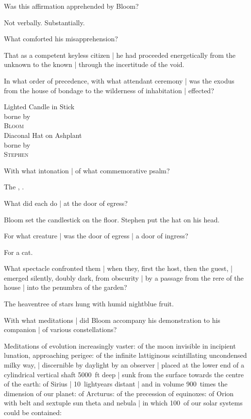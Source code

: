 Was this affirmation apprehended by Bloom?

\Factual
Not verbally.
Substantially.


What comforted his misapprehension?

\Bloom
That as a competent keyless citizen |
he had proceeded energetically from the unknown to the known |
through the incertitude of the void.



In what order of precedence,
with what attendant ceremony |
was the exodus from the house of bondage
to the wilderness of inhabitation |
effected?

\Theater
\begin{center}
Lighted Candle in Stick\\
borne by\\
\textsc{Bloom}\\
Diaconal Hat on Ashplant\\
borne by\\
\textsc{Stephen}
\end{center}


With what intonation  |
of what commemorative psalm?

\Religious
The ,
\/
\/
.



What did each do |
at the door of egress?

\Theater
Bloom set the candlestick on the floor.
Stephen put the hat on his head.


For what creature |
was the door of egress |
a door of ingress?

\Factual
For a cat.



What spectacle confronted them |
when they, first the host, then the guest, |
emerged silently, doubly dark, from obscurity |
by a passage from the rere of the house |
into the penumbra of the garden?

\Poetry
The heaventree of stars hung with humid nightblue fruit.


With what meditations |
did Bloom accompany his demonstration to his companion |
of various constellations?

\Science
Meditations of evolution increasingly vaster:
of the moon invisible in incipient lunation, approaching perigee:
of the infinite lattiginous scintillating uncondensed milky way, |
discernible by daylight by an observer |
placed at the lower end of a cylindrical vertical shaft 5000~ft deep |
sunk from the surface towards the centre of the earth:
of Sirius
 |
10~lightyears
distant |
and in volume 900~times the dimension of our planet:
of Arcturus:
of the precession of equinoxes:
of Orion with belt and sextuple sun theta and nebula |
in which 100~of our solar systems could be contained:


